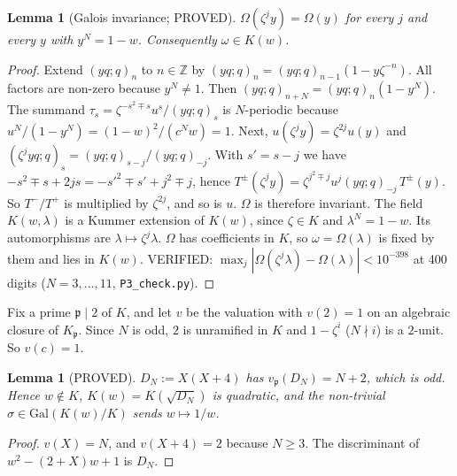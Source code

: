 \documentclass[11pt]{article}
\newtheorem{lemma}[theorem]{Lemma}
\theoremstyle{remark}
\newcommand{\Z}{\mathbb Z}
\begin{document}
\begin{lemma}[Galois invariance; PROVED]\label{lem:inv}
$\Omega(\zeta^jy)=\Omega(y)$ for every $j$ and every $y$ with $y^N=1-w$. Consequently $\omega\in K(w)$.
\end{lemma}
\begin{proof}
Extend $(yq;q)_n$ to $n\in\Z$ by $(yq;q)_n=(yq;q)_{n-1}(1-y\zeta^{-n})$. All factors are non-zero because
$y^N\ne1$. Then $(yq;q)_{n+N}=(yq;q)_n(1-y^N)$. The summand $\tau_s=\zeta^{-s^2\mp s}u^s/(yq;q)_s$ is
$N$-periodic because $u^N/(1-y^N)=(1-w)^2/(c^Nw)=1$. Next, $u(\zeta^jy)=\zeta^{2j}u(y)$ and
$(\zeta^jyq;q)_s=(yq;q)_{s-j}/(yq;q)_{-j}$. With $s'=s-j$ we have
$-s^2\mp s+2js=-s'^2\mp s'+j^2\mp j$, hence
$T^\pm(\zeta^jy)=\zeta^{j^2\mp j}u^j(yq;q)_{-j}\,T^\pm(y)$. So $T^-/T^+$ is multiplied by $\zeta^{2j}$, and so is $u$.
$\Omega$ is therefore invariant. The field $K(w,\lambda)$ is a Kummer extension of $K(w)$, since
$\zeta\in K$ and $\lambda^N=1-w$. Its automorphisms are $\lambda\mapsto\zeta^j\lambda$. $\Omega$ has
coefficients in $K$, so $\omega=\Omega(\lambda)$ is fixed by them and lies in $K(w)$. VERIFIED:
$\max_j|\Omega(\zeta^j\lambda)-\Omega(\lambda)|<10^{-398}$ at 400 digits ($N=3,\dots,11$, \texttt{P3\_check.py}).
\end{proof}

Fix a prime $\mathfrak p\mid2$ of $K$, and let $v$ be the valuation with $v(2)=1$ on an algebraic closure of
$K_{\mathfrak p}$. Since $N$ is odd, $2$ is unramified in $K$ and $1-\zeta^i$ ($N\nmid i$) is a $2$-unit. So $v(c)=1$.

\begin{lemma}[PROVED]\label{lem:D}
$D_N:=X(X+4)$ has $v_{\mathfrak p}(D_N)=N+2$, which is odd. Hence $w\notin K$, $K(w)=K(\sqrt{D_N})$ is
quadratic, and the non-trivial $\sigma\in\mathrm{Gal}(K(w)/K)$ sends $w\mapsto1/w$.
\end{lemma}
\begin{proof}
$v(X)=N$, and $v(X+4)=2$ because $N\ge3$. The discriminant of $w^2-(2+X)w+1$ is $D_N$.
\end{proof}
\end{document}
